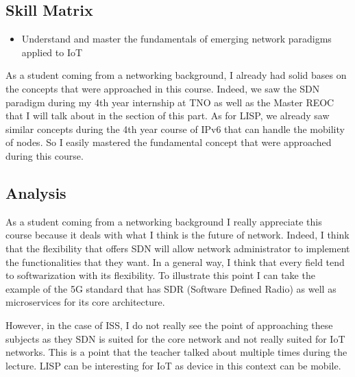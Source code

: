 \subsection{Skill Matrix}

\begin{itemize}
    \item Understand  and master the fundamentals of emerging network paradigms applied to IoT
\end{itemize}

As a student coming from a networking background, I already had solid bases on the concepts that were approached in this course. Indeed, we saw the SDN paradigm during my 4th year internship at TNO as well as the Master REOC that I will talk about in the section of this part. As for LISP, we already saw similar concepts during the 4th year course of IPv6 that can handle the mobility of nodes. So I easily mastered the fundamental concept that were approached during this course.

\subsection{Analysis}

As a student coming from a networking background I really appreciate this course because it deals with what I think is the future of network. Indeed, I think that the flexibility that offers SDN will allow network administrator to implement the functionalities that they want. In a general way, I think that every field tend to softwarization with its flexibility. To illustrate this  point I can take the example of the 5G standard that has SDR (Software Defined Radio) as well as microservices for its core architecture. 
\\\par
However, in the case of ISS, I do not really see the point of approaching these subjects as they SDN is suited for the core network and not really suited for IoT networks. This is a point that the teacher talked about multiple times during the lecture. LISP can be interesting for IoT as device in this context can be mobile.